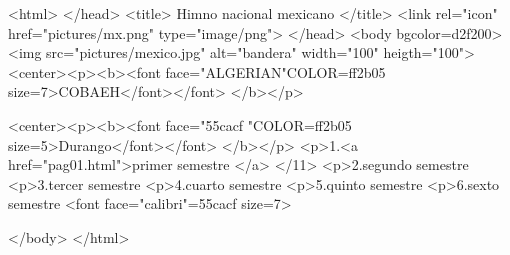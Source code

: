 <html>
</head>
<title> Himno nacional mexicano
</title>
<link rel="icon" href="pictures/mx.png" type="image/png">
</head>
<body bgcolor=d2f200>
<img src="pictures/mexico.jpg" alt="bandera"
width="100" heigth="100">
<center><p><b><font face="ALGERIAN"COLOR=ff2b05 size=7>COBAEH</font></font> </b></p>

<center><p><b><font face="55cacf "COLOR=ff2b05 size=5>Durango</font></font> </b></p>
<p>1.<a href="pag01.html">primer semestre </a> </11>
<p>2.segundo semestre
<p>3.tercer semestre
<p>4.cuarto semestre
<p>5.quinto semestre
<p>6.sexto semestre
<font face="calibri"=55cacf size=7>


</body>
</html>